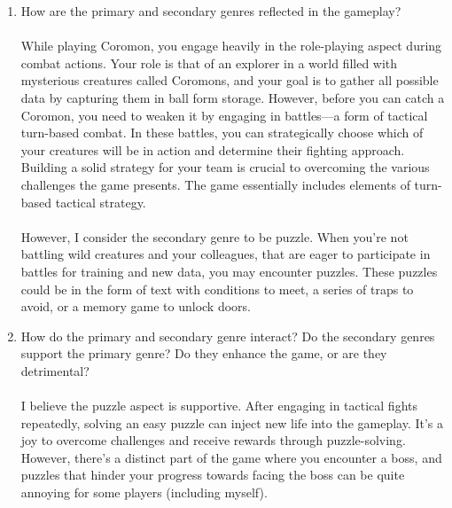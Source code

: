 \documentclass[a4paper,10pt,english]{article}
\begin{document}
\begin{enumerate}
    \item How are the primary and secondary genres reflected in the gameplay? \\ \\ While playing Coromon, you engage heavily in the role-playing aspect during combat actions. Your role is that of an explorer in a world filled with mysterious creatures called Coromons, and your goal is to gather all possible data by capturing them in ball form storage. However, before you can catch a Coromon, you need to weaken it by engaging in battles—a form of tactical turn-based combat. In these battles, you can strategically choose which of your creatures will be in action and determine their fighting approach. Building a solid strategy for your team is crucial to overcoming the various challenges the game presents. The game essentially includes elements of turn-based tactical strategy.\\ \\
    However, I consider the secondary genre to be puzzle. When you're not battling wild creatures and your colleagues, that are eager to participate in battles for training and new data, you may encounter puzzles. These puzzles could be in the form of text with conditions to meet, a series of traps to avoid, or a memory game to unlock doors.
    
    \item How do the primary and secondary genre interact? Do the secondary genres support the primary genre? Do they enhance the game, or are they detrimental? \\ \\ I believe the puzzle aspect is supportive. After engaging in tactical fights repeatedly, solving an easy puzzle can inject new life into the gameplay. It's a joy to overcome challenges and receive rewards through puzzle-solving. However, there's a distinct part of the game where you encounter a boss, and puzzles that hinder your progress towards facing the boss can be quite annoying for some players (including myself).
    

\end{enumerate}
\end{document}

